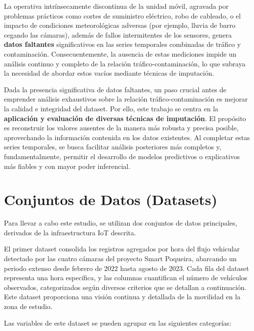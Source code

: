 La operativa intrínsecamente discontinua de la unidad móvil, agravada por problemas prácticos como cortes de suministro eléctrico, robo de cableado, o el impacto de condiciones meteorológicas adversas (por ejemplo, lluvia de barro cegando las cámaras), además de fallos intermitentes de los sensores, genera \textbf{datos faltantes} significativos en las series temporales combinadas de tráfico y contaminación. Consecuentemente, la ausencia de estas mediciones impide un análisis continuo y completo de la relación tráfico-contaminación, lo que subraya la necesidad de abordar estos vacíos mediante técnicas de imputación.

Dada la presencia significativa de datos faltantes, un paso crucial antes de emprender análisis exhaustivos sobre la relación tráfico-contaminación es mejorar la calidad e integridad del dataset. Por ello, este trabajo se centra en la \textbf{aplicación y evaluación de diversas técnicas de imputación}. El propósito es reconstruir los valores ausentes de la manera más robusta y precisa posible, aprovechando la información contenida en los datos existentes. Al completar estas series temporales, se busca facilitar análisis posteriores más completos y, fundamentalmente, permitir el desarrollo de modelos predictivos o explicativos más fiables y con mayor poder inferencial.

\section{Conjuntos de Datos (Datasets)}
\label{sec:datasets}

Para llevar a cabo este estudio, se utilizan dos conjuntos de datos principales, derivados de la infraestructura IoT descrita.

\label{subsec:dataset_trafico}
El primer dataset consolida los registros agregados por hora del flujo vehicular detectado por las cuatro cámaras  del proyecto Smart Poqueira, abarcando un periodo extenso desde febrero de 2022 hasta agosto de 2023. Cada fila del dataset representa una hora específica, y las columnas cuantifican el número de vehículos observados, categorizados según diversos criterios que se detallan a continuación. Este dataset proporciona una visión continua y detallada de la movilidad en la zona de estudio.

Las variables de este dataset se pueden agrupar en las siguientes categorías:

